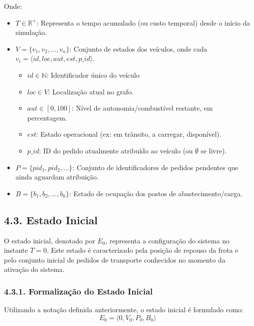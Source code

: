 \documentclass[a4paper]{article}
\begin{document}
\noindent Onde:
\begin{itemize}
    \item \( T \in \mathbb{R}^+ \): Representa o tempo acumulado (ou custo temporal) desde o início da simulação.

    \item \( V = \{ v_1, v_2, \dots, v_n \} \): Conjunto de estados dos veículos, onde cada \( v_i = \langle id, loc, aut, est, p\_id \rangle \).
    \begin{itemize}
        \item \( id \in \mathbb{N} \): Identificador único do veículo
        \item \( loc \in V \): Localização atual no grafo.
        \item \( aut \in [0, 100] \): Nível de autonomia/combustível restante, em percentagem.
        \item \( est \): Estado operacional (ex: em trânsito, a carregar, disponível).
        \item \( p\_id \): ID do pedido atualmente atribuído ao veículo (ou \( \emptyset \) se livre).
    \end{itemize}

    \item \( P = \{ pid_1, pid_2, \dots \} \): Conjunto de identificadores de pedidos pendentes que ainda aguardam atribuição.

    \item \( B = \{ b_1, b_2, \dots, b_k \} \): Estado de ocupação dos postos de abastecimento/carga.
\end{itemize}

\subsection*{4.3. Estado Inicial}
\noindent O estado inicial, denotado por \( E_0 \), representa a configuração do sistema no instante \( T = 0 \). Este estado é caracterizado pela posição de repouso da frota e pelo conjunto inicial de pedidos de transporte conhecidos no momento da ativação do sistema.

\subsubsection*{4.3.1. Formalização do Estado Inicial}
\noindent Utilizando a notação definida anteriormente, o estado inicial é formulado como:
\[
E_0 = \langle 0, V_0, P_0, B_0 \rangle
\]
\end{document}
